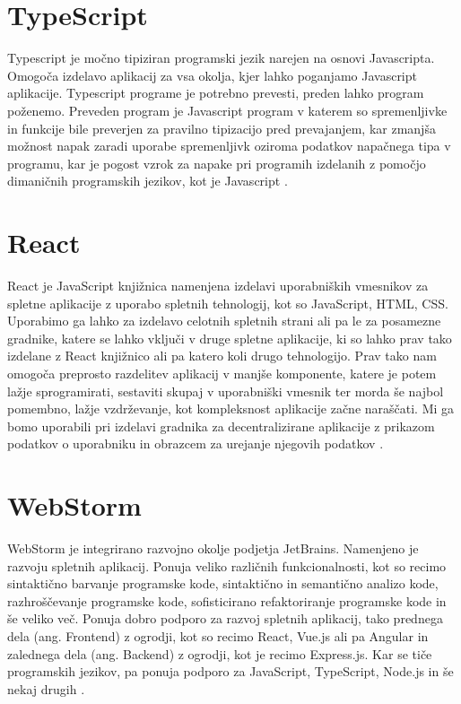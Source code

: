 \documentclass[a4paper,12pt,openright]{book}
\begin{document}
\section{TypeScript}
Typescript je močno tipiziran programski jezik narejen na osnovi Javascripta. 
Omogoča izdelavo aplikacij za vsa okolja, kjer lahko poganjamo Javascript aplikacije.
Typescript programe je potrebno prevesti, preden lahko program poženemo.
Preveden program je Javascript program v katerem so spremenljivke in funkcije bile preverjen za pravilno tipizacijo 
pred prevajanjem, kar zmanjša možnost napak zaradi uporabe spremenljivk oziroma podatkov napačnega tipa v programu, 
kar je pogost vzrok za napake pri programih izdelanih z pomočjo dimaničnih programskih jezikov, kot je Javascript \cite{typescript_homepage}.

\section{React}
React je JavaScript knjižnica namenjena izdelavi uporabniških vmesnikov za spletne aplikacije z uporabo spletnih tehnologij, kot so JavaScript, HTML, CSS.
Uporabimo ga lahko za izdelavo celotnih spletnih strani ali pa le za posamezne gradnike, katere se lahko vključi v 
druge spletne aplikacije, ki so lahko prav tako izdelane z React knjižnico ali pa katero koli drugo tehnologijo.
Prav tako nam omogoča preprosto razdelitev aplikacij v manjše komponente, katere je potem lažje sprogramirati, sestaviti skupaj v uporabniški vmesnik
ter morda še najbol pomembno, lažje vzdrževanje, kot kompleksnost aplikacije začne naraščati.
Mi ga bomo uporabili pri izdelavi gradnika za decentralizirane aplikacije z prikazom podatkov o uporabniku in obrazcem za urejanje njegovih podatkov \cite{react_homepage}.


\section{WebStorm}
WebStorm je integrirano razvojno okolje podjetja JetBrains.
Namenjeno je razvoju spletnih aplikacij. 
Ponuja veliko različnih funkcionalnosti, kot so recimo sintaktično barvanje programske kode, sintaktično in semantično
analizo kode, razhroščevanje programske kode, sofisticirano refaktoriranje programske kode in še veliko več.
Ponuja dobro podporo za razvoj spletnih aplikacij, tako prednega dela (ang. Frontend) z ogrodji, kot so recimo React, Vue.js ali pa Angular
in zalednega dela (ang. Backend) z ogrodji, kot je recimo Express.js.
Kar se tiče programskih jezikov, pa ponuja podporo za JavaScript, TypeScript, Node.js in še nekaj drugih \cite{jetbrains_webstorm}.
\end{document}
